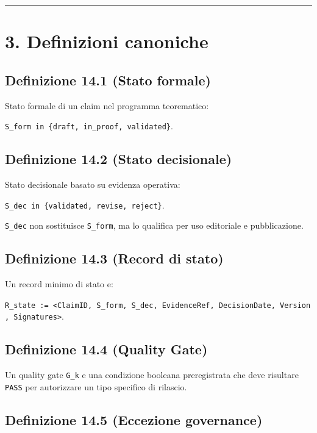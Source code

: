 \begin{center}\rule{0.5\linewidth}{0.5pt}\end{center}

\section{3. Definizioni canoniche}

\subsection{Definizione 14.1 (Stato formale)}

Stato formale di un claim nel programma teorematico:

\texttt{S\_form\ in\ \{draft,\ in\_proof,\ validated\}}.

\subsection{Definizione 14.2 (Stato decisionale)}

Stato decisionale basato su evidenza operativa:

\texttt{S\_dec\ in\ \{validated,\ revise,\ reject\}}.

\texttt{S\_dec} non sostituisce \texttt{S\_form}, ma lo qualifica per uso editoriale e pubblicazione.

\subsection{Definizione 14.3 (Record di stato)}

Un record minimo di stato e:

\texttt{R\_state\ :=\ \textless{}ClaimID,\ S\_form,\ S\_dec,\ EvidenceRef,\ DecisionDate,\ Version,\ Signatures\textgreater{}}.

\subsection{Definizione 14.4 (Quality Gate)}

Un quality gate \texttt{G\_k} e una condizione booleana preregistrata che deve risultare \texttt{PASS} per autorizzare un tipo specifico di rilascio.

\subsection{Definizione 14.5 (Eccezione governance)}

